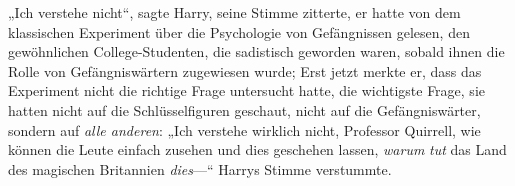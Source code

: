 „Ich verstehe nicht“, sagte Harry, seine Stimme zitterte, er hatte von dem klassischen Experiment über die Psychologie von Gefängnissen gelesen, den gewöhnlichen College-Studenten, die sadistisch geworden waren, sobald ihnen die Rolle von Gefängniswärtern zugewiesen wurde; Erst jetzt merkte er, dass das Experiment nicht die richtige Frage untersucht hatte, die wichtigste Frage, sie hatten nicht auf die Schlüsselfiguren geschaut, nicht auf die Gefängniswärter, sondern auf \emph{alle anderen}: „Ich verstehe wirklich nicht, Professor Quirrell, wie können die Leute einfach zusehen und dies geschehen lassen, \emph{warum} \emph{tut} das Land des magischen Britannien \emph{dies}—“ Harrys Stimme verstummte.

